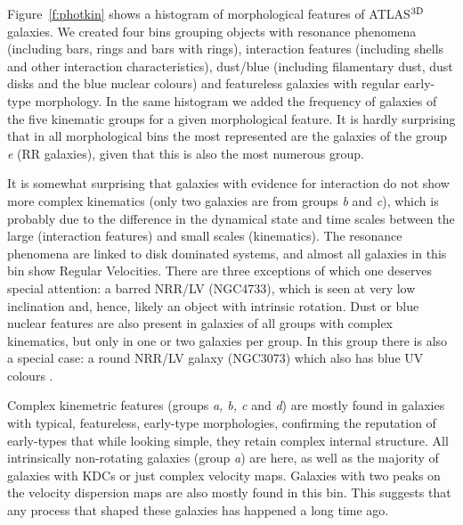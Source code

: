\documentclass[usenatbib,usegraphicx]{mn2e}
\begin{document}
Figure~\ref{f:photkin} shows a histogram of morphological features of ATLAS$^{\rm 3D}$ galaxies. We created four bins grouping objects with resonance phenomena (including bars, rings and bars with rings), interaction features (including shells and other interaction characteristics), dust/blue (including filamentary dust, dust disks and the blue nuclear colours) and featureless galaxies with regular early-type morphology. In the same histogram we added the frequency of galaxies of the five kinematic groups for a given morphological feature.  It is hardly surprising that in all morphological bins the most represented are the galaxies of the group {\it e} (RR galaxies), given that this is also the most numerous group. 

It is somewhat surprising that galaxies with evidence for interaction do not show more complex kinematics (only two galaxies are from groups {\it b} and {\it c}), which is probably due to the difference in the dynamical state and time scales between the large (interaction features) and small scales (kinematics). The resonance phenomena are linked to disk dominated systems, and almost all galaxies in this bin show Regular Velocities. There are three exceptions of which one deserves special attention:  a barred NRR/LV (NGC4733), which is seen at very low inclination and, hence, likely an object with intrinsic rotation. Dust or blue nuclear features are also present in galaxies of all groups with complex kinematics, but only in one or two galaxies per group. In this group there is also a special case: a round NRR/LV galaxy (NGC3073) which also has blue UV colours \citep{2007ApJS..173..597D}.

Complex kinemetric features (groups {\it a, b, c} and {\it d}) are mostly found in galaxies with typical, featureless, early-type morphologies, confirming the reputation of early-types that while looking simple, they retain complex internal structure. All intrinsically non-rotating galaxies (group {\it a}) are here, as well as the majority of galaxies with KDCs or just complex velocity maps. Galaxies with two peaks on the velocity dispersion maps are also mostly found in this bin. This suggests that any process that shaped these galaxies has happened a long time ago.
\end{document}
